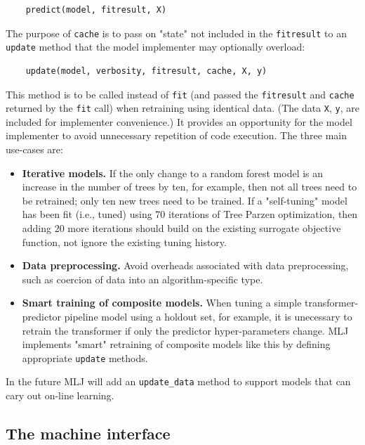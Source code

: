 \documentclass{article}
\begin{document}
\begin{verbatim}
    predict(model, fitresult, X)
\end{verbatim}

The purpose of \texttt{cache} is to pass on "state" not included in the \texttt{fitresult} to an \texttt{update} method that the model implementer may optionally overload:

\begin{verbatim}
    update(model, verbosity, fitresult, cache, X, y)    
\end{verbatim}

This method is to be called instead of \texttt{fit} (and passed the \texttt{fitresult} and \texttt{cache} returned by the \texttt{fit} call) when retraining using identical data. (The data \texttt{X}, \texttt{y}, are included for implementer convenience.) It provides an opportunity for the model implementer to avoid unnecessary repetition of code execution. The three main use-cases are:

\begin{itemize}
    \item \textbf{Iterative models.} If the only change to a random forest model is an increase in the number of trees by ten, for example, then not all trees need to be retrained; only ten new trees need to be trained. If a "self-tuning" model has been fit (i.e., tuned) using 70 iterations of Tree Parzen optimization, then adding 20 more iterations should build on the existing surrogate objective function, not ignore the existing tuning history.
    \item \textbf{Data preprocessing.} Avoid overheads associated with data preprocessing, such as coercion of data into an algorithm-specific type.
    \item \textbf{Smart training of composite models.} When tuning a simple transformer-predictor pipeline model using a holdout set, for example, it is unecessary to retrain the transformer if only the predictor hyper-parameters change. MLJ implements "smart" retraining of composite models like this by defining appropriate \texttt{update} methods.
\end{itemize}

In the future MLJ will add an \texttt{update\_data} method to support models that can cary out on-line learning.

\subsection{The machine interface}
\end{document}
